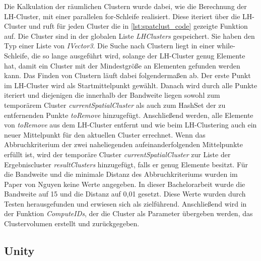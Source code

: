 Die Kalkulation der räumlichen Clustern wurde dabei, wie die Berechnung der LH-Cluster, mit einer parallelen for-Schleife realisiert. Diese iteriert über die LH-Cluster und ruft für jeden Cluster die in \autoref{lst:spatclust_code} gezeigte Funktion auf. Die Cluster sind in der globalen Liste \textit{LHClusters} gespeichert. Sie haben den Typ einer Liste von \textit{IVector3}. 
Die Suche nach Clustern liegt in einer while-Schleife, die so lange ausgeführt wird, solange der LH-Cluster genug Elemente hat, damit ein Cluster mit der Mindestgröße an Elementen gefunden werden kann. 
Das Finden von Clustern läuft dabei folgendermaßen ab. Der erste Punkt im LH-Cluster wird als Startmittelpunkt gewählt. Danach wird durch alle Punkte iteriert und diejenigen die innerhalb der Bandweite liegen sowohl zum temporärem Cluster \textit{currentSpatialCluster} als auch zum HashSet der zu entfernenden Punkte \textit{toRemove} hinzugefügt.
\newline
Anschließend werden, alle Elemente von \textit{toRemove} aus dem LH-Cluster entfernt und wie beim LH-Clustering auch ein neuer Mittelpunkt für den aktuellen Cluster errechnet.
Wenn das Abbruchkriterium der zwei naheliegenden aufeinanderfolgenden Mittelpunkte erfüllt ist, wird der temporäre Cluster \textit{currentSpatialCluster} zur Liste der Ergebniscluster \textit{resultClusters} hinzugefügt, falls er genug Elemente besitzt.
\newline
Für die Bandweite und die minimale Distanz des Abbruchkriteriums wurden im Paper von Nguyen \cite{nguyen2012clustering} keine Werte angegeben. In dieser Bachelorarbeit wurde die Bandweite auf 15 und die Distanz auf 0,01 gesetzt. Diese Werte wurden durch Testen herausgefunden und erwiesen sich als zielführend.
Anschließend wird in der Funktion \textit{ComputeIDs}, der die Cluster als Parameter übergeben werden, das Clustervolumen erstellt und zurückgegeben.



\subsection{Unity}

